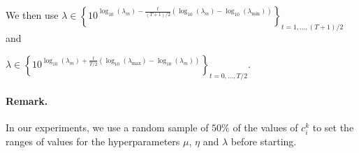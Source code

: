 \documentclass[12pt,a4paper]{article}
\begin{document}
 We then use $\lambda \in \left \{ 10^ {\log_{10}(\lambda_{m}) - \frac{t}{(T+1)/2} 
 \left (\log_{10}(\lambda_{m}) - \log_{10}(\lambda_{\min}) \right)} \right \}_{t = 1, \dots, (T+1)/2}$ and

$\lambda \in \left \{ 10^ {\log_{10}(\lambda_{m}) + \frac{t}{T/2} 
\left (\log_{10}(\lambda_{\max}) - \log_{10}(\lambda_{m}) \right)} \right \}_{t = 0, \dots, T/2}$.



\paragraph{Remark.} In our experiments, we use a random sample of $50\%$ of the values of $c_i^k$ to set the ranges of values for the hyperparameters $\mu$, $\eta$ and $\lambda$ before starting.
\end{document}
